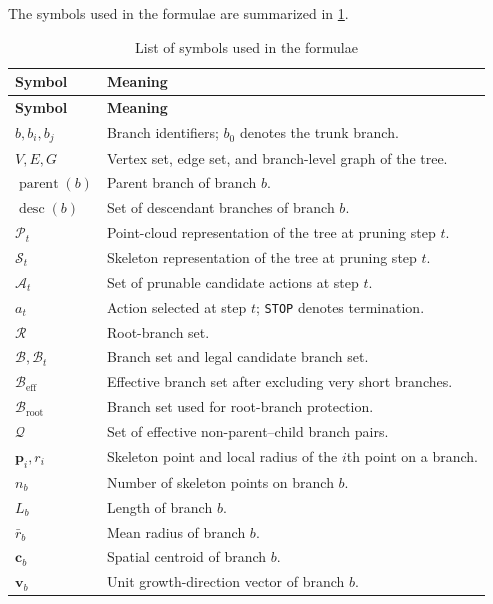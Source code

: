 \documentclass[12pt,a4paper,fontset=fandol]{ctexart}
\begin{document}
The symbols used in the formulae are summarized in \cref{tab:symbols}.

\footnotesize
\begin{longtable}{>{\raggedright\arraybackslash}p{}
                  >{\raggedright\arraybackslash}p{}}
\caption{List of symbols used in the formulae}\label{tab:symbols}\\
\toprule
\textbf{Symbol} & \textbf{Meaning} \\
\midrule
\endfirsthead
\toprule
\textbf{Symbol} & \textbf{Meaning} \\
\midrule
\endhead
\bottomrule
\endfoot
$b, b_i, b_j$ & Branch identifiers; $b_0$ denotes the trunk branch. \\
$V, E, G$ & Vertex set, edge set, and branch-level graph of the tree. \\
$\operatorname{parent}(b)$ & Parent branch of branch $b$. \\
$\operatorname{desc}(b)$ & Set of descendant branches of branch $b$. \\
$\mathcal{P}_t$ & Point-cloud representation of the tree at pruning step $t$. \\
$\mathcal{S}_t$ & Skeleton representation of the tree at pruning step $t$. \\
$\mathcal{A}_t$ & Set of prunable candidate actions at step $t$. \\
$a_t$ & Action selected at step $t$; \texttt{STOP} denotes termination. \\
$\mathcal{R}$ & Root-branch set. \\
$\mathcal{B}, \mathcal{B}_t$ & Branch set and legal candidate branch set. \\
$\mathcal{B}_{\mathrm{eff}}$ & Effective branch set after excluding very short branches. \\
$\mathcal{B}_{\mathrm{root}}$ & Branch set used for root-branch protection. \\
$\mathcal{Q}$ & Set of effective non-parent--child branch pairs. \\
$\mathbf{p}_i, r_i$ & Skeleton point and local radius of the $i$th point on a branch. \\
$n_b$ & Number of skeleton points on branch $b$. \\
$L_b$ & Length of branch $b$. \\
$\bar{r}_b$ & Mean radius of branch $b$. \\
$\mathbf{c}_b$ & Spatial centroid of branch $b$. \\
$\mathbf{v}_b$ & Unit growth-direction vector of branch $b$. \\

\end{longtable}
\end{document}
